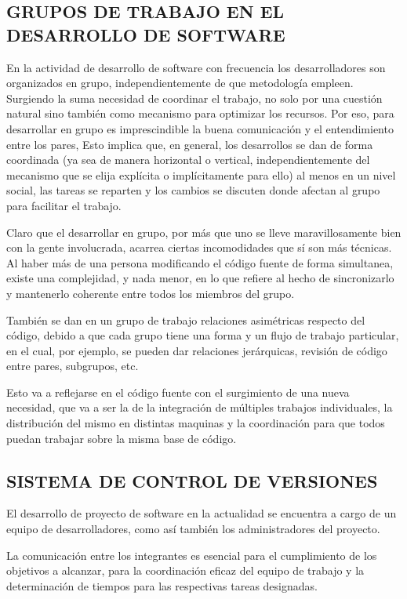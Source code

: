 \subsection{GRUPOS DE TRABAJO EN EL DESARROLLO DE SOFTWARE}
En la actividad de desarrollo de software con frecuencia los desarrolladores son organizados en grupo, independientemente de que metodología empleen. Surgiendo la suma necesidad de coordinar el trabajo, no solo por una cuestión natural sino también como mecanismo para optimizar los recursos.
Por eso, para desarrollar en grupo es imprescindible la buena comunicación y el entendimiento entre los pares, Esto implica que, en general, los desarrollos se dan de forma coordinada (ya sea de manera horizontal o vertical, independientemente del mecanismo que se elija explícita o implícitamente para ello) al menos en un nivel social, las tareas se reparten y los cambios se discuten donde afectan al grupo para facilitar el trabajo.

Claro que el desarrollar en grupo, por más que uno se lleve maravillosamente bien con la gente involucrada, acarrea ciertas incomodidades que sí son más técnicas. Al haber más de una persona modificando el código fuente de forma simultanea, existe una complejidad, y nada menor, en lo que refiere al hecho de sincronizarlo y mantenerlo coherente entre todos los miembros del grupo.

También se dan en un grupo de trabajo relaciones asimétricas respecto del código, debido a que cada grupo tiene una forma y un flujo de trabajo particular, en el cual, por ejemplo, se pueden dar relaciones jerárquicas, revisión de código entre pares, subgrupos, etc.

Esto va a reflejarse en el código fuente con el surgimiento de una nueva necesidad, que va a ser la de la integración de múltiples trabajos individuales, la distribución del mismo en distintas maquinas y la coordinación para que todos puedan trabajar sobre la misma base de código.

\subsection{SISTEMA DE CONTROL DE VERSIONES}

El desarrollo de proyecto de software en la actualidad se encuentra a cargo de un equipo de desarrolladores, como así también los administradores del proyecto.

La comunicación entre los integrantes es esencial para el cumplimiento de los objetivos a alcanzar, para la coordinación eficaz del equipo de trabajo y la determinación de tiempos para las respectivas tareas designadas.

